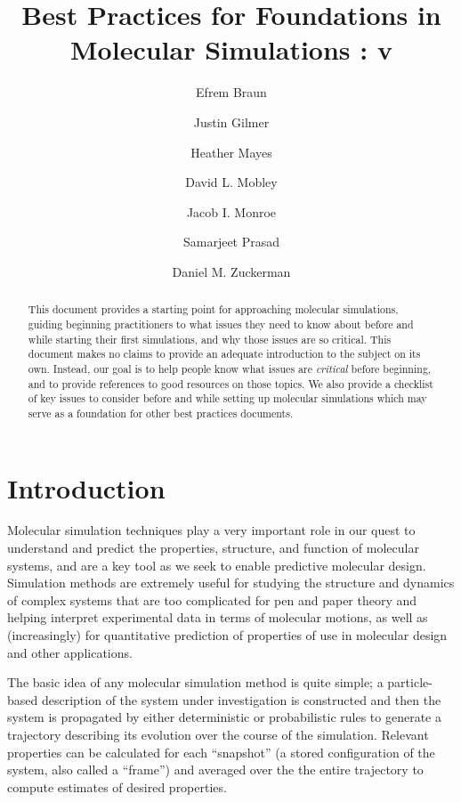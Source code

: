 \documentclass[9pt,bestpractices]{livecoms}
\title{Best Practices for Foundations in Molecular Simulations : v\versionnumber}
\author[1]{Efrem Braun}
\author[2]{Justin Gilmer}
\author[3]{Heather Mayes}
\author[4]{David L. Mobley}
\author[5]{Jacob I. Monroe}
\author[6]{Samarjeet Prasad}
\author[7]{Daniel M. Zuckerman}
\affil[1]{University of California, Berkeley}
\affil[2]{Vanderbilt University}
\affil[3]{University of Michigan}
\affil[4]{University of California, Irvine}
\affil[5]{University of California, Santa Barbara}
\affil[6]{National Institutes of Health}
\affil[7]{Oregon Health and Science University}
\begin{document}
\begin{frontmatter}
\maketitle

\begin{abstract}
This document provides a starting point for approaching molecular simulations, guiding beginning practitioners to what issues they need to know about before and while starting their first simulations, and why those issues are so critical. 
This document makes no claims to provide an adequate introduction to the subject on its own. 
Instead, our goal is to help people know what issues are \emph{critical} before beginning, and to provide references to good resources on those topics. 
We also provide a checklist of key issues to consider before and while setting up molecular simulations which may serve as a foundation for other best practices documents.
\end{abstract}
\end{frontmatter}


\todototoc
\listoftodos

\section{Introduction}
\label{sec:intro}

Molecular simulation techniques play a very important role in our quest to understand and predict the properties, structure, and function of molecular systems, and are a key tool as we seek to enable predictive molecular design.
Simulation methods are extremely useful for studying the structure and dynamics of complex systems that are too complicated for pen and paper theory and helping interpret experimental data in terms of molecular motions, as well as (increasingly) for quantitative prediction of properties of use in molecular design and other applications.

The basic idea of any molecular simulation method is quite simple; a particle-based description of the system under investigation is constructed and then the system is propagated by either deterministic or probabilistic rules to generate a trajectory describing its evolution over the course of the simulation. 
Relevant properties can be calculated for each ``snapshot'' (a stored configuration of the system, also called a ``frame'') and averaged over the the entire trajectory to compute estimates of desired properties.
\end{document}
